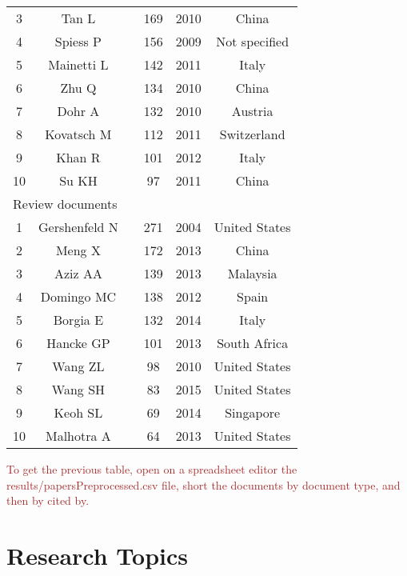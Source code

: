 \documentclass[symmetry,article,accept,moreauthors,pdftex10pt,a4paper]{mdpi}
\begin{document}
\begin{table}[H]
\begin{tabular}{cccccc}
	3 & Tan L & \cite{Tan2010} & 169 & 2010 & China \\
	4 & Spiess P & \cite{Spiess2009968} & 156 & 2009 & Not specified \\
	5 & Mainetti L & \cite{Mainetti201116} & 142 & 2011 & Italy \\
	6 & Zhu Q & \cite{Zhu2010347} & 134 & 2010 & China \\
	7 & Dohr A & \cite{Dohr2010804} & 132 & 2010 & Austria \\
	8 & Kovatsch M & \cite{Kovatsch2011855} & 112 & 2011 & Switzerland \\
	9 & Khan R & \cite{Khan2012257} & 101 & 2012 & Italy \\
	10 & Su KH & \cite{Su20111028} & 97 & 2011 & China \\  \midrule
	\multicolumn{6}{l}{Review documents} \\
    \midrule
	1 & Gershenfeld N & \cite{Gershenfeld200476} & 271 & 2004 & United States \\
	2 & Meng X & \cite{Meng2013146} & 172 & 2013 & China \\
	3 & Aziz AA & \cite{Aziz2013121} & 139 & 2013 & Malaysia \\
	4 & Domingo MC & \cite{Domingo2012584} & 138 & 2012 & Spain \\
	5 & Borgia E & \cite{Borgia20141} & 132 & 2014 & Italy \\
	6 & Hancke GP & \cite{Hancke2013393} & 101 & 2013 & South Africa \\
	7 & Wang ZL & \cite{Wang2010320} & 98 & 2010 & United States \\
	8 & Wang SH & \cite{Wang2015436} & 83 & 2015 & United States \\
	9 & Keoh SL & \cite{Keoh2014265} & 69 & 2014 & Singapore \\
	10 & Malhotra A & \cite{Malhotra20131265} & 64 & 2013 & United States\\
   	\bottomrule
	\end{tabular}
	\end{table}

\noindent
\textcolor{brown}{To get the previous table, open on a spreadsheet editor the results/papersPreprocessed.csv file, short the documents by document type, and then by cited by.}


\section{Research Topics}
\end{document}
